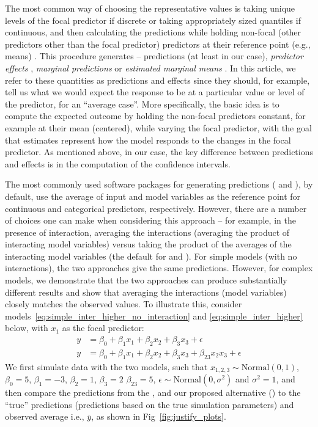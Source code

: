 The most common way of choosing the representative values is taking unique levels of the focal predictor if discrete or taking appropriately sized quantiles if continuous, and then calculating the predictions while holding non-focal (other predictors other than the focal predictor) predictors at their reference point (e.g., means) \citep{fox2009effect, hanmer2013behind}. This procedure generates -- predictions (at least in our case), \emph{predictor effects} \citep{fox2009effect}, \emph{marginal predictions} \citep{leeper2017package} or \emph{estimated marginal means} \citep{lenth2018package}. In this article, we refer to these quantities as predictions and effects since they should, for example, tell us what we would expect the response to be at a particular value or level of the predictor, for an ``average case''. More specifically, the basic idea is to compute the expected outcome by holding the non-focal predictors constant, for example at their mean (centered), while varying the focal predictor, with the goal that estimates represent how the model responds to the changes in the focal predictor. As mentioned above, in our case, the key difference between predictions and effects is in the computation of the confidence intervals.

The most commonly used  software packages for generating predictions ( and ), by default, use the average of input and model variables as the reference point for continuous and categorical predictors, respectively. However, there are a number of choices one can make when considering this approach -- for example, in the presence of interaction, averaging the interactions (averaging the product of interacting model variables) versus taking the product of the averages of the interacting model variables (the default for  and ). For simple models (with no interactions), the two approaches give the same predictions. However, for complex models, we demonstrate that the two approaches can produce substantially different results and show that averaging the interactions (model variables) closely matches the observed values. To illustrate this, consider models~\ref{eq:simple_inter_higher_no_interaction} and \ref{eq:simple_inter_higher} below, with $x_1$ as the focal predictor:
%
\begin{align}
y &= \beta_0 + \beta_1x_1 + \beta_2x_2 + \beta_3x_3 + \epsilon \label{eq:simple_inter_higher_no_interaction}\\
y &= \beta_0 + \beta_1x_1 + \beta_2x_2 + \beta_3x_3 + \beta_{23}x_2x_3 + \epsilon \label{eq:simple_inter_higher}
\end{align}
%
We first simulate data with the two models, such that $x_{1,2,3} \sim \mathrm{Normal}(0, 1)$, $\beta_0 = 5$, $\beta_1 = -3$, $\beta_2 = 1$, $\beta_3 = 2$ $\beta_{23} = 5$, $\epsilon \sim \mathrm{Normal}(0, \sigma^2)$ and $\sigma^2 = 1$, and then compare the predictions from the ,  and our proposed alternative () to the ``true'' predictions (predictions based on the true simulation parameters) and observed average i.e., $\bar{y}$, as shown in Fig~\ref{fig:justify_plots}.

